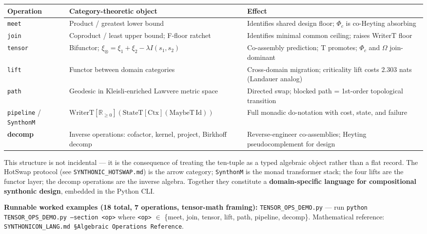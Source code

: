 \documentclass[12pt,a4paper]{article}
\begin{document}
\begin{table}[htbp]
\centering
\small
{}
\begin{tabularx}{\textwidth}{>{\centering\arraybackslash}X >{\centering\arraybackslash}X >{\centering\arraybackslash}X}
\toprule
\rowcolor{gray!25}\textbf{Operation} & \textbf{Category-theoretic object} & \textbf{Effect} \\
\midrule
\rowcolors{1}{white}{gray!10}
\texttt{meet} & Product / greatest lower bound & Identifies shared design floor; $\Phi_c$ is co-Heyting absorbing \\
\texttt{join} & Coproduct / least upper bound; F-floor ratchet & Identifies minimal common ceiling; raises WriterT floor \\
\texttt{tensor} & Bifunctor; $\xi_\otimes = \xi_1+\xi_2-\lambda I(s_1,s_2)$ & Co-assembly prediction; T promotes; $\Phi_c$ and $\Omega$ join-dominant \\
\texttt{lift} & Functor between domain categories & Cross-domain migration; criticality lift costs 2.303 nats (Landauer analog) \\
\texttt{path} & Geodesic in Kleisli-enriched Lawvere metric space & Directed swap; blocked path = 1st-order topological transition \\
\texttt{pipeline} / \texttt{SynthonM} & $\text{WriterT}[\mathbb{R}_{\geq0}](\text{StateT}[\text{Ctx}](\text{MaybeT}\,\text{Id}))$ & Full monadic do-notation with cost, state, and failure \\
\textbf{decomp} & Inverse operations: cofactor, kernel, project, Birkhoff decomp & Reverse-engineer co-assemblies; Heyting pseudocomplement for design \\
\bottomrule
\end{tabularx}
\end{table}

This structure is not incidental --- it is the consequence of treating the ten-tuple as a typed algebraic object rather than a flat record. The HotSwap protocol (see \texttt{SYNTHONIC\_HOTSWAP.md}) is the arrow category; \texttt{SynthonM} is the monad transformer stack; the four lifts are the functor layer; the decomp operations are the inverse algebra. Together they constitute a \textbf{domain-specific language for compositional synthonic design}, embedded in the Python CLI.

\textbf{Runnable worked examples (18 total, 7 operations, tensor-math framing):} \texttt{TENSOR\_OPS\_DEMO.py} --- run \texttt{python TENSOR\_OPS\_DEMO.py --section \textless{}op\textgreater{}} where \texttt{\textless{}op\textgreater{}} $\in$ \{meet, join, tensor, lift, path, pipeline, decomp\}. Mathematical reference: \texttt{SYNTHONICON\_LANG.md §Algebraic Operations Reference}.
\end{document}
